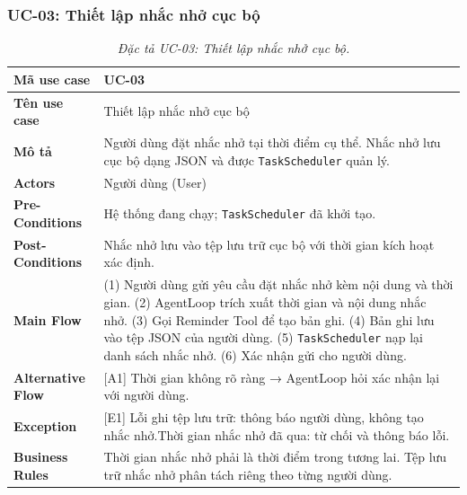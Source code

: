 \subsubsection{UC-03: Thiết lập nhắc nhở cục bộ}
\label{subsec:spec-uc03}
\renewcommand{\arraystretch}{1.4}
\begin{longtable}{|>{\bfseries}p{3.5cm}|p{10.5cm}|}
  \caption{\emph{Đặc tả UC-03: Thiết lập nhắc nhở cục bộ.}} \label{tab:spec-uc03} \\
  \hline
  Mã use case      & UC-03 \\ \hline
  Tên use case     & Thiết lập nhắc nhở cục bộ \\ \hline
  Mô tả            & Người dùng đặt nhắc nhở tại thời điểm cụ thể. Nhắc nhở lưu cục bộ dạng JSON và được \texttt{TaskScheduler} quản lý. \\ \hline
  Actors           & Người dùng (User) \\ \hline
  Pre-Conditions   & Hệ thống đang chạy; \texttt{TaskScheduler} đã khởi tạo. \\ \hline
  Post-Conditions  & Nhắc nhở lưu vào tệp lưu trữ cục bộ với thời gian kích hoạt xác định. \\ \hline
  Main Flow        & (1) Người dùng gửi yêu cầu đặt nhắc nhở kèm nội dung và thời gian.\newline
                     (2) AgentLoop trích xuất thời gian và nội dung nhắc nhở.\newline
                     (3) Gọi Reminder Tool để tạo bản ghi.\newline
                     (4) Bản ghi lưu vào tệp JSON của người dùng.\newline
                     (5) \texttt{TaskScheduler} nạp lại danh sách nhắc nhở.\newline
                     (6) Xác nhận gửi cho người dùng. \\ \hline
  Alternative Flow & [A1] Thời gian không rõ ràng → AgentLoop hỏi xác nhận lại với người dùng. \\ \hline
  Exception        & [E1] Lỗi ghi tệp lưu trữ: thông báo người dùng, không tạo nhắc nhở.\newline
                     [E2] Thời gian nhắc nhở đã qua: từ chối và thông báo lỗi. \\ \hline
  Business Rules   & Thời gian nhắc nhở phải là thời điểm trong tương lai.\newline
                     Tệp lưu trữ nhắc nhở phân tách riêng theo từng người dùng. \\ \hline
\end{longtable}

